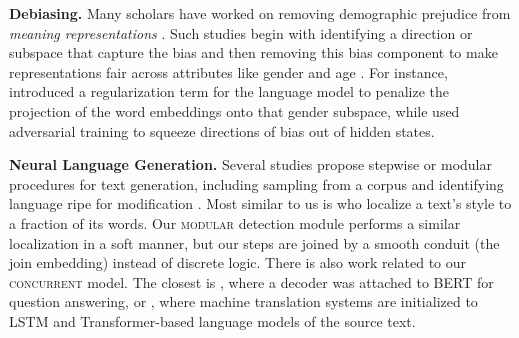 \textbf{Debiasing.}
Many scholars have worked on removing demographic prejudice from \emph{meaning representations} \cite[inter alia]{manzini2019black,zhao2017men,zhao2018gender,bordia2019identifying,wang2018adversarial}. 
Such studies begin with identifying a direction or subspace that capture the bias and then removing this bias component to make representations fair across attributes like gender and age \cite{bolukbasi2016man,manzini2019black}.
For instance, \citet{bordia2019identifying} introduced a regularization term for the language model to penalize the projection of the word embeddings onto that gender subspace, while \citet{wang2018adversarial} used adversarial training to squeeze directions of bias out of hidden states.

\textbf{Neural Language Generation.} Several studies propose stepwise or modular procedures for text generation, including sampling from a corpus \cite{guu2018generating} and identifying language ripe for modification \cite{leeftink2019towards}. Most similar to us is \citet{li2018delete} who localize a text's style to a fraction of its words. Our \textsc{modular} detection module performs a similar localization in a soft manner, but our steps are joined by a smooth conduit (the join embedding) instead of discrete logic. There is also work related to our \textsc{concurrent} model. The closest is \citet{dunextending}, where a decoder was attached to BERT for question answering, or \citet{lample2018phrase}, where machine translation systems are initialized to LSTM and Transformer-based language models of the source text. 

 
 
